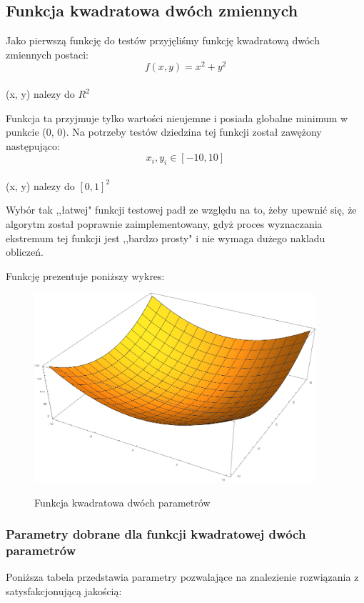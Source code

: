 \documentclass[twoside]{projektInzynierskiMS1}
\newcommand{\si}{ś}
\begin{document}
	\subsection{Funkcja kwadratowa dwóch zmiennych}
	Jako pierwszą funkcję do testów przyjęli\si my funkcję kwadratową dwóch zmiennych postaci:
\[f(x, y) = x^2 + y^2 \] \\(x, y) nalezy do $R^2$

Funkcja ta przyjmuje tylko warto\si ci nieujemne i posiada globalne minimum w punkcie (0, 0). Na potrzeby testów dziedzina tej funkcji został zawężony następująco:
\[x_i, y_i \in [-10, 10] \] \\ 
(x, y) nalezy do $[0,1]^2$

Wybór tak ,,łatwej" funkcji testowej padł ze względu na to, żeby upewnić się, że algorytm został poprawnie zaimplementowany, gdyż proces wyznaczania ekstremum tej funkcji jest ,,bardzo prosty" i nie wymaga dużego nakladu obliczeń.

Funkcję prezentuje poniższy wykres:\\
\begin{figure}[H]
	\begin{center}
		\includegraphics[height=7cm]{pics/quadraticFunction1.png}\\
	\end{center}
	\caption{Funkcja kwadratowa dwóch parametrów}
\end{figure}

	\subsubsection{Parametry dobrane dla funkcji kwadratowej dwóch parametrów}
Poniższa tabela przedstawia parametry pozwalające na znalezienie rozwiązania z satysfakcjonującą jako\si cią:\\
\end{document}
